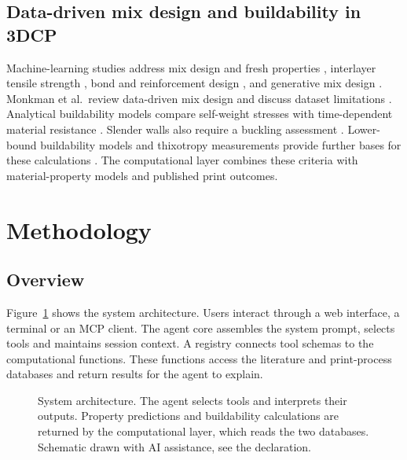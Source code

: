 \documentclass[preprint,12pt]{elsarticle}
\newcommand{\aidisclosure}{Schematic drawn with AI assistance, see the declaration.}
\begin{document}
\subsection{Data-driven mix design and buildability in 3DCP}

Machine-learning studies address mix design and fresh properties \cite{malik2024mixdesign3dcp,zafar2025ensemblerheology}, interlayer tensile strength \cite{ali2023mltensile3dcp}, bond and reinforcement design \cite{ma2024trustworthyml3dcp}, and generative mix design \cite{wang2024deepgenerative3dcp}. Monkman et al.\ review data-driven mix design and discuss dataset limitations \cite{monkman2026datadrivenreview}. Analytical buildability models compare self-weight stresses with time-dependent material resistance \cite{roussel2018rheological,perrot2016structural,reiter2018role}. Slender walls also require a buckling assessment \cite{suiker2018mechanical,wolfs2018early}. Lower-bound buildability models and thixotropy measurements provide further bases for these calculations \cite{kruger2019lowerbound,kruger2019thixotropy}. The computational layer combines these criteria with material-property models and published print outcomes.

\section{Methodology}\label{sec:method}

\subsection{Overview}

Figure~\ref{fig:arch} shows the system architecture. Users interact through a web interface, a terminal or an MCP client. The agent core assembles the system prompt, selects tools and maintains session context. A registry connects tool schemas to the computational functions. These functions access the literature and print-process databases and return results for the agent to explain.

\begin{figure}[t]
\centering
\resizebox{\textwidth}{!}{}
\caption{System architecture. The agent selects tools and interprets their outputs. Property predictions and buildability calculations are returned by the computational layer, which reads the two databases. \aidisclosure}
\label{fig:arch}
\end{figure}
\end{document}
